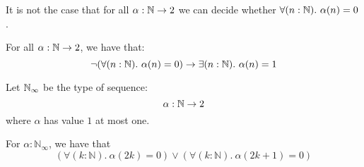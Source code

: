 
\begin{theorem}
   It is not the case that for all $\alpha:\mathbb{N}\to 2$ we can decide whether $\forall (n:\mathbb{N}).\ \alpha(n)=0$.
\end{theorem}

\begin{theorem}
  For all $\alpha:\mathbb{N}\to 2$, we have that:
   \[\neg(\forall (n:\mathbb{N}).\ \alpha(n)=0) \to \exists (n:\mathbb{N}).\ \alpha(n)=1\]
\end{theorem}

\begin{definition}
Let $\mathbb{N}_{\infty}$ be the type of sequence:
\[\alpha:\mathbb{N}\to 2\]
where $\alpha$ has value $1$ at most one.
\end{definition}

\begin{theorem}
  For $\alpha:\mathbb N_\infty$, 
  we have that 
  \begin{equation}\label{eqnLLPO}
    \left(\forall (k:\mathbb N).\ \alpha(2k) = 0 \right) \vee \left(\forall (k:\mathbb N).\ \alpha(2k+1) = 0\right)
  \end{equation}
\end{theorem}